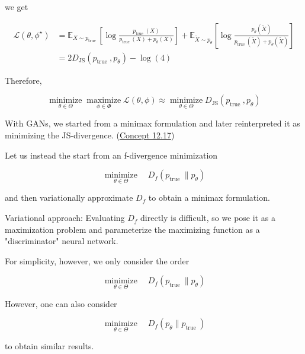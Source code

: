\begin{concept}
    we get

    $$
    \begin{aligned}
    \mathcal{L}\left(\theta, \phi^{\star}\right) & =\mathbb{E}_{X \sim p_{\text {true }}}\left[\log \frac{p_{\text {true }}(X)}{p_{\text {true }}(X)+p_{\theta}(X)}\right]+\mathbb{E}_{\tilde{X} \sim p_{\theta}}\left[\log \frac{p_{\theta}(\tilde{X})}{p_{\text {true }}(\tilde{X})+p_{\theta}(\tilde{X})}\right] \\
    & =2 D_{\mathrm{JS}}\left(p_{\text {true }}, p_{\theta}\right)-\log (4)
    \end{aligned}
    $$

    Therefore,

    $$
    \underset{\theta \in \Theta}{\operatorname{minimize}} \underset{\phi \in \Phi}{\operatorname{maximize}} \mathcal{L}(\theta, \phi) \approx \underset{\theta \in \Theta}{\operatorname{minimize}} D_{\mathrm{JS}}\left(p_{\text {true }}, p_{\theta}\right)
    $$
\end{concept}

\par\noindent\textcolor{gray}{\hdashrule{\textwidth}{0.4pt}{1pt 2pt}}

\begin{concept}
    With GANs, we started from a minimax formulation and later reinterpreted it as minimizing the JS-divergence. (\hyperref[concept:12.17]{Concept 12.17})

    Let us instead the start from an f-divergence minimization

    $$
    \underset{\theta \in \Theta}{\operatorname{minimize}} \quad D_{f}\left(p_{\text {true }} \| p_{\theta}\right)
    $$

    and then variationally approximate $D_{f}$ to obtain a minimax formulation.

    Variational approach: Evaluating $D_{f}$ directly is difficult, so we pose it as a maximization problem and parameterize the maximizing function as a "discriminator" neural network.

    \par\noindent\textcolor{gray}{\hdashrule{\textwidth}{0.4pt}{1pt 2pt}}

    For simplicity, however, we only consider the order

    $$
    \underset{\theta \in \Theta}{\operatorname{minimize}} \quad D_{f}\left(p_{\text {true }} \| p_{\theta}\right)
    $$

    However, one can also consider

    $$
    \underset{\theta \in \Theta}{\operatorname{minimize}} \quad D_{f}\left(p_{\theta} \| p_{\text {true }}\right)
    $$

    to obtain similar results.
\end{concept}


